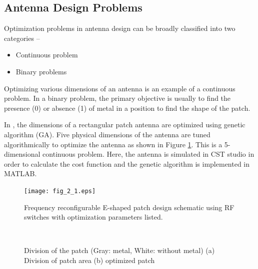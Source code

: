 \subsection{Antenna Design Problems}
Optimization problems in antenna design can be broadly classified into two categories --
\begin{itemize}
\item Continuous problem
\item Binary problems
\end{itemize}

Optimizing various dimensions of an antenna is an example of a continuous problem. In a binary problem, the primary objective is usually to find the presence (0) or absence (1) of metal in a position to find the shape of the patch.

In \cite{patch_miniaturize_ga}, the dimensions of a rectangular patch antenna are optimized using genetic algorithm (GA). Five physical dimensions of the antenna are tuned algorithmically to optimize the antenna as shown in Figure \ref{fig_2_1}. This is a 5-dimensional continuous problem. Here, the antenna is simulated in CST studio in order to calculate the cost function and the genetic algorithm is implemented in MATLAB.

\begin{figure}
  \centering
  \texttt{[image: fig\_2\_1.eps]}\\
  \caption[Frequency reconfigurable E-shaped patch design schematic using RF switches with optimization parameters listed.] {Frequency reconfigurable E-shaped patch design schematic using RF switches with optimization parameters listed. \cite{patch_miniaturize_ga}} \label{fig_2_1}
\end{figure}

\begin{figure}
  \centering
  ~~~~~~~~~~~~~~~~~~~~~
  \\
  \caption [Division of the patch (Gray: metal, White: without metal) (a) Division of patch area (b) optimized patch]{Division of the patch (Gray: metal, White: without metal) (a) Division of patch area (b) optimized patch \cite{optPatch}} \label{fig_2_2}
\end{figure}

